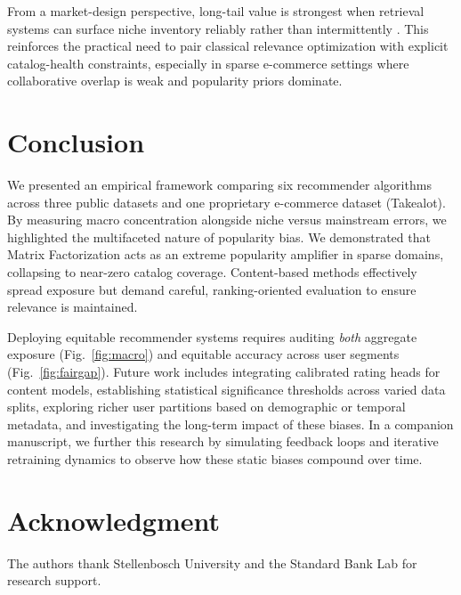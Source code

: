 \documentclass[conference]{IEEEtran}
\begin{document}
From a market-design perspective, long-tail value is strongest when retrieval systems can surface niche inventory reliably rather than intermittently \cite{brynjolfsson2006longtail}. This reinforces the practical need to pair classical relevance optimization with explicit catalog-health constraints, especially in sparse e-commerce settings where collaborative overlap is weak and popularity priors dominate.

\section{Conclusion}
\label{sec:conclusion}

We presented an empirical framework comparing six recommender algorithms across three public datasets and one proprietary e-commerce dataset (Takealot). By measuring macro concentration alongside niche versus mainstream errors, we highlighted the multifaceted nature of popularity bias. We demonstrated that Matrix Factorization acts as an extreme popularity amplifier in sparse domains, collapsing to near-zero catalog coverage. Content-based methods effectively spread exposure but demand careful, ranking-oriented evaluation to ensure relevance is maintained.

Deploying equitable recommender systems requires auditing \emph{both} aggregate exposure (Fig.~\ref{fig:macro}) and equitable accuracy across user segments (Fig.~\ref{fig:fairgap}). Future work includes integrating calibrated rating heads for content models, establishing statistical significance thresholds across varied data splits, exploring richer user partitions based on demographic or temporal metadata, and investigating the long-term impact of these biases. In a companion manuscript, we further this research by simulating feedback loops and iterative retraining dynamics to observe how these static biases compound over time.

\section*{Acknowledgment}
The authors thank Stellenbosch University and the Standard Bank Lab for research support.

\clearpage


\end{document}
